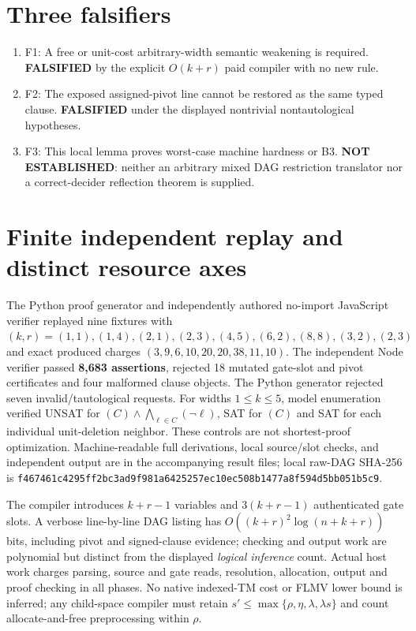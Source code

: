 \documentclass[11pt]{article}
\begin{document}
\section*{Three falsifiers}
\begin{enumerate}
\item[] F1: A free or unit-cost arbitrary-width semantic weakening is required. \textbf{FALSIFIED} by the explicit $O(k+r)$ paid compiler with no new rule.
\item[] F2: The exposed assigned-pivot line cannot be restored as the same typed clause. \textbf{FALSIFIED} under the displayed nontrivial nontautological hypotheses.
\item[] F3: This local lemma proves worst-case machine hardness or B3. \textbf{NOT ESTABLISHED}: neither an arbitrary mixed DAG restriction translator nor a correct-decider reflection theorem is supplied.
\end{enumerate}

\section*{Finite independent replay and distinct resource axes}
The Python proof generator and independently authored no-import JavaScript verifier replayed nine fixtures with $(k,r)=(1,1),(1,4),(2,1),(2,3),(4,5),(6,2),(8,8),(3,2),(2,3)$ and exact produced charges $(3,9,6,10,20,20,38,11,10)$. The independent Node verifier passed \textbf{8,683 assertions}, rejected 18 mutated gate-slot and pivot certificates and four malformed clause objects. The Python generator rejected seven invalid/tautological requests. For widths $1\le k\le5$, model enumeration verified UNSAT for $(C)\land\bigwedge_{\ell\in C}(\neg\ell)$, SAT for $(C)$ and SAT for each individual unit-deletion neighbor. These controls are not shortest-proof optimization. Machine-readable full derivations, local source/slot checks, and independent output are in the accompanying result files; local raw-DAG SHA-256 is \texttt{f467461c4295ff2bc3ad9f981a6425257ec10ec508b1477a8f594d5bb051b5c9}.

The compiler introduces $k+r-1$ variables and $3(k+r-1)$ authenticated gate slots. A verbose line-by-line DAG listing has $O((k+r)^2\log(n+k+r))$ bits, including pivot and signed-clause evidence; checking and output work are polynomial but distinct from the displayed \emph{logical inference} count. Actual host work charges parsing, source and gate reads, resolution, allocation, output and proof checking in all phases. No native indexed-TM cost or FLMV lower bound is inferred; any child-space compiler must retain $s'\le\max\{\rho,\eta,\lambda,\lambda s\}$ and count allocate-and-free preprocessing within $\rho$.
\end{document}
